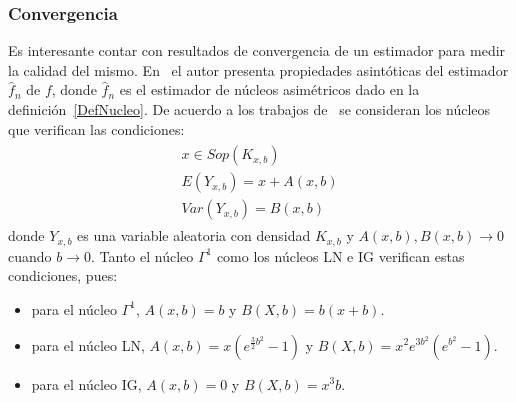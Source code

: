 



\subsubsection{Convergencia}

Es interesante contar con resultados de convergencia de un estimador para medir la calidad del mismo. En~\citet{Libnegue2013} el autor presenta propiedades asintóticas del estimador $\widehat{f}_n$ de $f$, donde $\widehat{f}_n$ es el estimador de núcleos asimétricos dado en la definición~\ref{DefNucleo}. De acuerdo a los trabajos de~\citet{Libnegue2013,kokonendji2018} se consideran los núcleos que verifican las condiciones: 
\begin{align}
\label{CondNucleos}
\begin{split}
x \in Sop(K_{x,b})\\
E(Y_{x,b})=x+A(x,b)\\
Var(Y_{x,b})=B(x,b)
\end{split}
\end{align}
donde $Y_{x,b}$ es una variable aleatoria con densidad $K_{x,b}$ y $A(x,b),B(x,b) \to 0$ cuando $b \to 0$. Tanto el núcleo $\Gamma^1$ como los núcleos LN e IG verifican estas condiciones, pues:
\begin{itemize}
	\item para el núcleo $\Gamma^1$, $A(x,b)=b$ y $B(X,b)=b(x+b)$.
	\item para el núcleo LN, $A(x,b)=x(e^{\frac{3}{2} b^2}-1)$ y $B(X,b)=x^2 e^{3b^2} (e^{b^2}-1)$.
	\item para el núcleo IG, $A(x,b)=0$ y $B(X,b)=x^3 b$.
\end{itemize}

